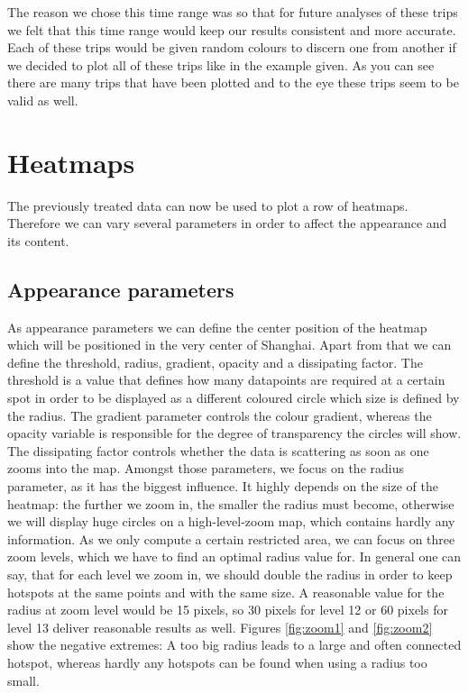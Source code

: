 \documentclass[11pt,conference,a4paper,twocolumns,romanappendices]{IEEEtran}
\begin{document}
The reason we chose this time range was so that for future analyses of these trips we felt that this time range would keep our results consistent and more accurate. Each of these trips would be given random colours to discern one from another if we decided to plot all of these trips like in the example given. As you can see there are many trips that have been plotted and to the eye these trips seem to be valid as well. \\

\section{Heatmaps}
The previously treated data can now be used to plot a row of heatmaps. Therefore we can vary several parameters in order to affect the appearance and its content. \\
\subsection{Appearance parameters}
As appearance parameters we can define the center position of the heatmap which will be positioned in the very center of Shanghai. Apart from that we can define the threshold, radius, gradient, opacity and a dissipating factor. The threshold is a value that defines how many datapoints are required at a certain spot in order to be displayed as a different coloured circle which size is defined by the radius. The gradient parameter controls the colour gradient, whereas the opacity variable is responsible for the degree of transparency the circles will show. The dissipating factor controls whether the data is scattering as soon as one zooms into the map.
Amongst those parameters, we focus on the radius parameter, as it has the biggest influence. It highly depends on the size of the heatmap: the further we zoom in, the smaller the radius must become, otherwise we will display huge circles on a high-level-zoom map, which contains hardly any information. As we only compute a certain restricted area, we can focus on three zoom levels, which we have to find an optimal radius value for. In general one can say, that for each level we zoom in, we should double the radius in order to keep hotspots at the same points and with the same size. A reasonable value for the radius at zoom level would be 15 pixels, so 30 pixels for level 12 or 60 pixels for level 13 deliver reasonable results as well. Figures \ref{fig:zoom1} and \ref{fig:zoom2} show the negative extremes: A too big radius leads to a large and often connected hotspot, whereas hardly any hotspots can be found when using a radius too small.
\end{document}
